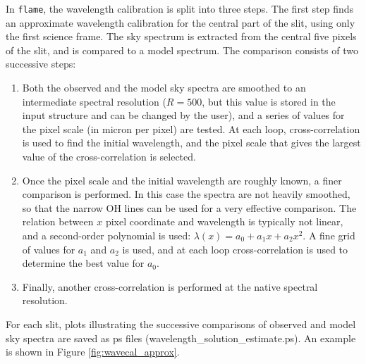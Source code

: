 \documentclass[a4paper, notitlepage]{article}
\newcommand{\flame}{\texttt{flame}}
\begin{document}
In \flame, the wavelength calibration is split into three steps. The first step finds an approximate wavelength calibration for the central part of the slit, using only the first science frame. The sky spectrum is extracted from the central five pixels of the slit, and is compared to a model spectrum. The comparison consists of two successive steps:
\begin{enumerate}
\item Both the observed and the model sky spectra are smoothed to an intermediate spectral resolution ($R=500$, but this value is stored in the input structure and can be changed by the user), and a series of values for the pixel scale (in micron per pixel) are tested. At each loop, cross-correlation is used to find the initial wavelength, and the pixel scale that gives the largest value of the cross-correlation is selected.
\item Once the pixel scale and the initial wavelength are roughly known, a finer comparison is performed. In this case the spectra are not heavily smoothed, so that the narrow OH lines can be used for a very effective comparison. The relation between $x$ pixel coordinate and wavelength is typically not linear, and a second-order polynomial is used: $\lambda(x) = a_0 + a_1 x + a_2 x^2$. A fine grid of values for $a_1$ and $a_2$ is used, and at each loop cross-correlation is used to determine the best value for $a_0$.
\item Finally, another cross-correlation is performed at the native spectral resolution.
\end{enumerate}

For each slit, plots illustrating the successive comparisons of observed and model sky spectra are saved as ps files (wavelength\_solution\_estimate.ps). An example is shown in Figure \ref{fig:wavecal_approx}.
\end{document}

